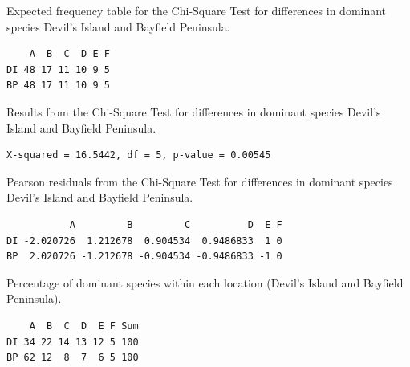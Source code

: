 \documentclass[10pt,openany]{book}\usepackage[]{graphicx}\usepackage[]{color}
\makeatletter
\newenvironment{kframe}{%
 \def\at@end@of@kframe{}%
 \ifinner\ifhmode%
  \def\at@end@of@kframe{\end{minipage}}%
  \begin{minipage}{\columnwidth}%
 \fi\fi%
 \def\FrameCommand##1{\hskip\@totalleftmargin \hskip-\fboxsep
 \colorbox{shadecolor}{##1}\hskip-\fboxsep
     \hskip-\linewidth \hskip-\@totalleftmargin \hskip\columnwidth}%
 \MakeFramed {\advance\hsize-\width
   \@totalleftmargin\z@ \linewidth\hsize
   \@setminipage}}%
 {\par\unskip\endMakeFramed%
 \at@end@of@kframe}
\newenvironment{knitrout}{}{} %
\makeatother
\begin{document}
\begin{table}[h]
  \caption{Expected frequency table for the Chi-Square Test for differences in dominant species Devil's Island and Bayfield Peninsula.}
  \label{tab:ChiAIexp}
  \vspace{-12pt}
\begin{knitrout}
\color{fgcolor}\begin{kframe}
\begin{verbatim}
    A  B  C  D E F
DI 48 17 11 10 9 5
BP 48 17 11 10 9 5
\end{verbatim}
\end{kframe}
\end{knitrout}
\end{table}

\begin{table}[h]
  \caption{Results from the Chi-Square Test for differences in dominant species Devil's Island and Bayfield Peninsula.}
  \label{tab:ChiAIchi}
  \vspace{-12pt}
\begin{knitrout}
\color{fgcolor}\begin{kframe}
\begin{verbatim}
X-squared = 16.5442, df = 5, p-value = 0.00545
\end{verbatim}
\end{kframe}
\end{knitrout}
\end{table}

\begin{table}[h]
  \caption{Pearson residuals from the Chi-Square Test for differences in dominant species Devil's Island and Bayfield Peninsula.}
  \label{tab:ChiAIres}
  \vspace{-12pt}
\begin{knitrout}
\color{fgcolor}\begin{kframe}
\begin{verbatim}
           A         B         C          D  E F
DI -2.020726  1.212678  0.904534  0.9486833  1 0
BP  2.020726 -1.212678 -0.904534 -0.9486833 -1 0
\end{verbatim}
\end{kframe}
\end{knitrout}
\end{table}

\begin{table}[h]
  \caption{Percentage of dominant species within each location (Devil's Island and Bayfield Peninsula).}
  \label{tab:ChiAIrow}
  \vspace{-12pt}
\begin{knitrout}
\color{fgcolor}\begin{kframe}
\begin{verbatim}
    A  B  C  D  E F Sum
DI 34 22 14 13 12 5 100
BP 62 12  8  7  6 5 100
\end{verbatim}
\end{kframe}
\end{knitrout}
\end{table}
\end{document}
